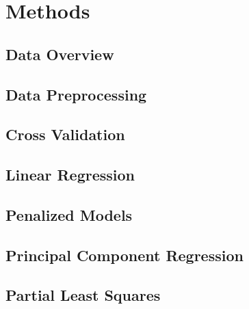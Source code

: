 \section{Methods}

\subsection{Data Overview}

\subsection{Data Preprocessing}

\subsection{Cross Validation}

\subsection{Linear Regression}

\subsection{Penalized Models}

\subsection{Principal Component Regression}

\subsection{Partial Least Squares}

